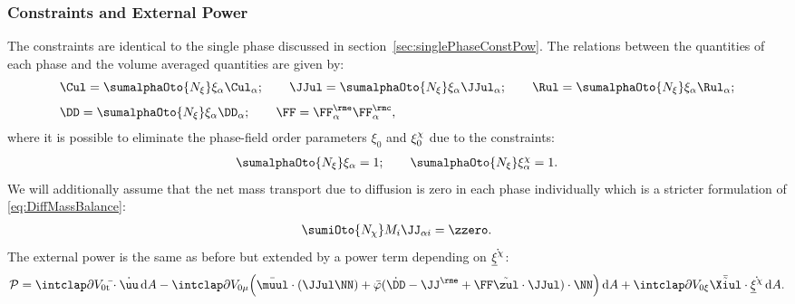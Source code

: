 \subsubsection{Constraints and External Power} %
The constraints are identical to the single phase discussed in section~\ref{sec:singlePhaseConstPow}. The relations between the quantities of each phase and the volume averaged quantities are given by:
\begin{align}
  \begin{aligned}
  &\Cul = \sumalphaOto{\Nxi} \xia \Cula; \qquad 
  \JJul = \sumalphaOto{\Nxi}\xia\JJula; \qquad   
  \Rul=\sumalphaOto{\Nxi}\xia\Rula;
  \\[3pt]
  &\DD=\sumalphaOto{\Nxi}\xia\DDa; \qquad
  \FF=\FFea\FFca,
  \end{aligned}
\end{align}
where it is possible to eliminate the phase-field order parameters $\xi_0$ and $\xi^{\chi}_0$ due to the constraints: 
\begin{align}
  \sumalphaOto{\Nxi} \xia = 1; \qquad \sumalphaOto{\Nxi} \xichia = 1.
\end{align}
We will additionally assume that the net mass transport due to diffusion is zero in each phase individually which is a stricter formulation of \cref{eq:DiffMassBalance}:
\begin{align}
  \sumiOto{\Nchi}M_i \JJ_{\alpha i} = \zzero.
\end{align}
The external power is the same as before but extended by a power term depending on $\dot{\underline{\xi}^{\chi}}$:
\begin{align}
  \Pow = \intdVOx{t} \bar\tt \cdot \dot\uu \dA - \intdVOx{\mu} \Big(\bar\muul\cdot(\JJul\NN) + \bar\varphi(\dot\DD-\JJe+\FF\tilde\zul\cdot\JJul)\cdot\NN \Big) \dA  + \intdVOx{\xi} \bar{\Xiultilde} \cdot \dot \xichiul \dA.
\end{align}

